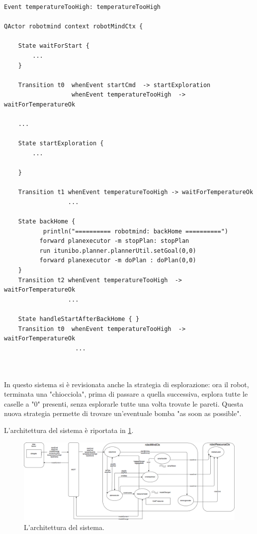 \begin{lstlisting}[backgroundcolor=\color{white}, label={lst:robotmind_ddr_sys_6_temp}, caption={Codice di QActor robotmind in ddrSystem6} ]
Event temperatureTooHigh: temperatureTooHigh

QActor robotmind context robotMindCtx {

	State waitForStart {
		...
	}

	Transition t0  whenEvent startCmd  -> startExploration
				   whenEvent temperatureTooHigh  -> waitForTemperatureOk
   
    ...
    
    State startExploration {
    	...
		
	} 

	Transition t1 whenEvent temperatureTooHigh -> waitForTemperatureOk
	              ...

    State backHome {
		   println("========== robotmind: backHome ==========")	  
		  forward planexecutor -m stopPlan: stopPlan
		  run itunibo.planner.plannerUtil.setGoal(0,0)
		  forward planexecutor -m doPlan : doPlan(0,0)   
	}
	Transition t2 whenEvent temperatureTooHigh  -> waitForTemperatureOk
	              ...
	              
	State handleStartAfterBackHome { }
	Transition t0  whenEvent temperatureTooHigh  -> waitForTemperatureOk
	                ...
	
	              
\end{lstlisting}





In questo sistema si è revisionata anche la strategia di esplorazione: ora il robot, terminata una "chiocciola", prima di passare a quella successiva, esplora tutte le caselle a "0" presenti, senza esplorarle tutte una volta trovate le pareti. Questa nuova strategia permette di trovare un'eventuale bomba "as soon as possible".


L'architettura del sistema è riportata in \cref{fig:arch_logica_6}.

\begin{figure}[H]
  \includegraphics[width=1.7\textwidth, angle=270]{img/sprint6/arch_logica_6.png}
  \caption{L'architettura del sistema.}
  \label{fig:arch_logica_6}
\end{figure}



